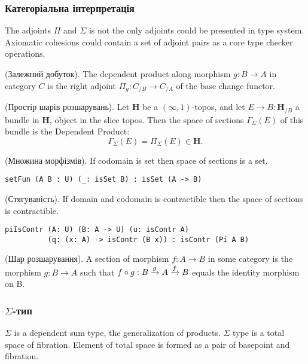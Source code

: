 \subsubsection*{Категоріальна інтерпретація}
The adjoints $\Pi$ and $\Sigma$ is not the only adjoints could be presented in type system.
Axiomatic cohesions could contain a set of adjoint pairs as a core type checker operations.

\begin{definition} (Залежний добуток).
The dependent product along morphism $g: B \rightarrow A$ in category $C$ is the right
adjoint $\Pi_g : C_{/B} \rightarrow C_{/A}$ of the base change functor.
\end{definition}

\begin{definition} (Простір шарів розшарувань).
Let $\mathbf{H}$ be a $(\infty,1)$-topos, and let $E \rightarrow B : \mathbf{H}_{/B}$ a bundle in
$\mathbf{H}$, object in the slice topos. Then the space of sections $\Gamma_\Sigma(E)$
of this bundle is the Dependent Product:
$$ \Gamma_\Sigma(E) = \Pi_\Sigma (E) \in \mathbf{H}. $$
\end{definition}

\begin{theorem} (Множина морфізмів).
If codomain is set then space of sections is a set.
\begin{lstlisting}
setFun (A B : U) (_: isSet B) : isSet (A -> B)
\end{lstlisting}
\end{theorem}

\begin{theorem} (Стягуваність).
If domain and codomain is contractible then the space of sections is contractible.
\begin{lstlisting}
piIsContr (A: U) (B: A -> U) (u: isContr A)
          (q: (x: A) -> isContr (B x)) : isContr (Pi A B)
\end{lstlisting}
\end{theorem}

\begin{definition} (Шар розшарування).
A section of morphism $f: A \rightarrow B$ in some category is the morphism $g: B \rightarrow A$
such that $f \circ g: B \xrightarrow{{g}} A \xrightarrow{{f}} B$ equals the identity morphism on B.
\end{definition}

\newpage
\subsubsection{$\Sigma$-тип}
$\Sigma$ is a dependent sum type, the generalization of products.
$\Sigma$ type is a total space of fibration. Element of total
space is formed as a pair of basepoint and fibration.

